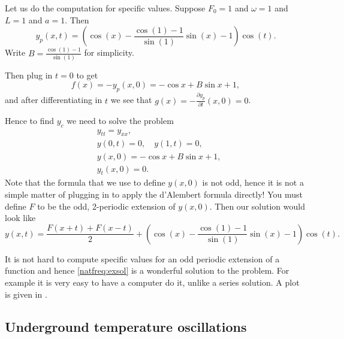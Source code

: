 \begin{example}
Let us do the computation for specific values.
Suppose $F_0 = 1$ and $\omega = 1$ and $L=1$ and $a=1$.  Then 
\begin{equation*}
y_p(x,t) =
\left(
\cos (x) -
\frac{\cos (1) - 1}{\sin (1)}
\sin (x)
-1
\right)
\cos (t) .
\end{equation*}
Write $B = \frac{\cos (1) - 1}{\sin (1)}$ for simplicity.

Then plug in $t=0$ to get
\begin{equation*}
f(x) =- y_p(x,0) = 
- \cos x +
B \sin x
+1 ,
\end{equation*}
and after differentiating in $t$ we see that 
$g(x) = -\frac{\partial y_p}{\partial t}(x,0) = 0$.

Hence to find $y_c$ we need to solve the problem
\begin{align*}
& y_{tt} = y_{xx} , \\
& y(0,t) = 0 , \quad y(1,t) = 0 , \\
& y(x,0) = - \cos x + B \sin x +1 , \\
& y_t(x,0) = 0 .
\end{align*}
Note that the formula that we use to define $y(x,0)$ is not odd,
hence it is not a simple matter of plugging in to apply the d'Alembert
formula directly!  You must define $F$ to be the odd, 2-periodic
extension of $y(x,0)$.  Then our solution would look like
\begin{equation} \label{natfreq:exsol}
y(x,t) = 
\frac{F(x+t) + F(x-t)}{2} + 
\left(
\cos (x) -
\frac{\cos (1) - 1}{\sin (1)}
\sin (x)
-1
\right)
\cos (t) .
\end{equation}

It is not hard to compute specific values
for an odd periodic extension of a function and
hence \eqref{natfreq:exsol} is a wonderful solution to the problem.
For example it is very easy to have a computer do it, unlike a series solution.
A plot is given in .
\begin{myfig}
\capstart
{}
\caption{Plot of $y(x,t) = \frac{F(x+t) + F(x-t)}{2} + \left( \cos (x) -
\frac{\cos (1) - 1}{\sin (1)} \sin (x) -1 \right) \cos (t)$.%
\label{natfreq:forcedvibfig}}
\end{myfig}
\end{example}

\subsection{Underground temperature oscillations}


